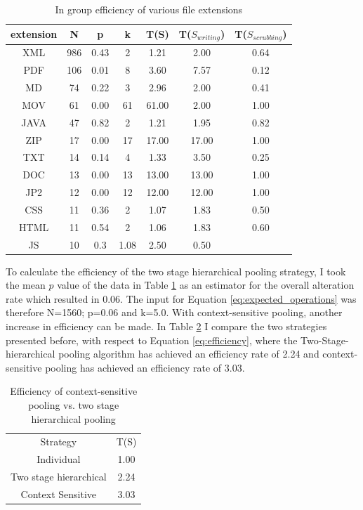 \begin{table}[b]
    \caption{In group efficiency of various file extensions}
    \centering
    \begin{tabular}{ c c c c c c c}
    \label{tb:efficiency}
     extension & N & p & k & T(S) & T($S_{writing}$) & T($S_{scrubbing}$) \\ 
     \hline
     XML & 986 & 0.43 & 2 & 1.21  & 2.00 & 0.64\\  
     \hline
     PDF &106 &0.01 & 8 &  3.60 & 7.57 & 0.12\\
     \hline
     MD & 74 & 0.22  & 3 & 2.96 & 2.00 & 0.41\\    
     \hline
     MOV&61 & 0.00 &  61 & 61.00 & 2.00 & 1.00\\  
     \hline
     JAVA &47 &0.82 & 2  & 1.21 & 1.95 & 0.82\\  
     \hline
     ZIP & 17 &0.00 &  17 & 17.00 & 17.00 & 1.00\\
     \hline
     TXT & 14 & 0.14 &  4 & 1.33 & 3.50 & 0.25\\ 
     \hline
     DOC & 13 & 0.00 &  13 & 13.00 & 13.00 & 1.00\\   
     \hline
     JP2 & 12 & 0.00 &  12 & 12.00 & 12.00 & 1.00\\   
     \hline
     CSS & 11 & 0.36 & 2  & 1.07 & 1.83 & 0.50\\  
     \hline
     HTML & 11 & 0.54 &  2 & 1.06 & 1.83 & 0.60\\   
     \hline
     JS & 10 & 0.3 & 1.08 & 2.50 & 0.50
    \end{tabular}
\end{table}

To calculate the efficiency of the two stage hierarchical pooling strategy, I took the mean $p$ value of the data in Table \ref{tb:efficiency} as an estimator for the overall alteration rate which resulted in 0.06. The input for Equation \ref{eq:expected_operations} was therefore N=1560; p=0.06 and k=5.0.
With context-sensitive pooling, another increase in efficiency can be made. In Table \ref{tb:context-sensitive} I compare the two strategies presented before, with respect to Equation \ref{eq:efficiency}, where the Two-Stage-hierarchical pooling algorithm has achieved an efficiency rate of 2.24 and context-sensitive pooling has achieved an efficiency rate of 3.03. 
\begin{table}[b]
    \caption{Efficiency of context-sensitive pooling vs. two stage hierarchical pooling}
    \centering
    \begin{tabular}{c c}
    \label{tb:context-sensitive}
    Strategy & T(S) \\
    Individual & 1.00 \\
    Two stage hierarchical & 2.24 \\
    Context Sensitive & 3.03 
    \end{tabular}
\end{table}


